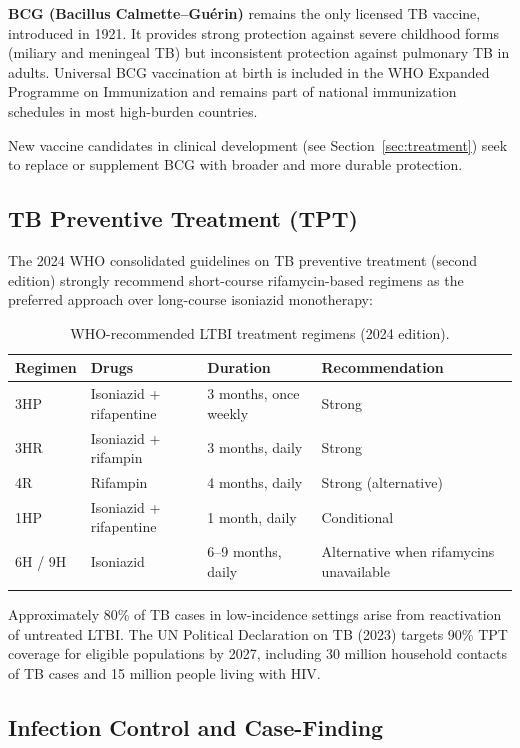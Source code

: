 \documentclass[11pt]{article}
\begin{document}
\textbf{BCG (Bacillus Calmette--Gu\'{e}rin)} remains the only licensed TB vaccine, introduced in 1921. It provides strong protection against severe childhood forms (miliary and meningeal TB) but inconsistent protection against pulmonary TB in adults. Universal BCG vaccination at birth is included in the WHO Expanded Programme on Immunization and remains part of national immunization schedules in most high-burden countries.

New vaccine candidates in clinical development (see Section~\ref{sec:treatment}) seek to replace or supplement BCG with broader and more durable protection.

\subsection{TB Preventive Treatment (TPT)}

The 2024 WHO consolidated guidelines on TB preventive treatment (second edition) strongly recommend short-course rifamycin-based regimens as the preferred approach over long-course isoniazid monotherapy:

\begin{longtable}{llll}
\toprule
\textbf{Regimen} & \textbf{Drugs} & \textbf{Duration} & \textbf{Recommendation} \\
\midrule
3HP & Isoniazid + rifapentine & 3 months, once weekly & Strong \\
3HR & Isoniazid + rifampin & 3 months, daily & Strong \\
4R  & Rifampin & 4 months, daily & Strong (alternative) \\
1HP & Isoniazid + rifapentine & 1 month, daily & Conditional \\
6H / 9H & Isoniazid & 6--9 months, daily & Alternative when rifamycins unavailable \\
\bottomrule
\caption{WHO-recommended LTBI treatment regimens (2024 edition).}
\label{tab:tpt}
\end{longtable}

Approximately 80\% of TB cases in low-incidence settings arise from reactivation of untreated LTBI. The UN Political Declaration on TB (2023) targets 90\% TPT coverage for eligible populations by 2027, including 30 million household contacts of TB cases and 15 million people living with HIV.

\subsection{Infection Control and Case-Finding}
\end{document}
